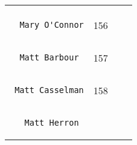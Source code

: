\documentclass[]{article}
\begin{document}
\begin{longtable}[c]{@{}llll@{}}
\begin{minipage}[t]{0.15\columnwidth}
\end{minipage}
\\\noalign{\medskip}
\begin{minipage}[t]{0.39\columnwidth}\raggedright
\begin{verbatim}
  Mary O'Connor
\end{verbatim}
\end{minipage} & \begin{minipage}[t]{0.10\columnwidth}\raggedright
156
\end{minipage} & \begin{minipage}[t]{0.13\columnwidth}\raggedright
\end{minipage} & \begin{minipage}[t]{0.15\columnwidth}\raggedright
\end{minipage}
\\\noalign{\medskip}
\begin{minipage}[t]{0.39\columnwidth}\raggedright
\begin{verbatim}
  Matt Barbour
\end{verbatim}
\end{minipage} & \begin{minipage}[t]{0.10\columnwidth}\raggedright
157
\end{minipage} & \begin{minipage}[t]{0.13\columnwidth}\raggedright
\end{minipage} & \begin{minipage}[t]{0.15\columnwidth}\raggedright
\end{minipage}
\\\noalign{\medskip}
\begin{minipage}[t]{0.39\columnwidth}\raggedright
\begin{verbatim}
 Matt Casselman
\end{verbatim}
\end{minipage} & \begin{minipage}[t]{0.10\columnwidth}\raggedright
158
\end{minipage} & \begin{minipage}[t]{0.13\columnwidth}\raggedright
\end{minipage} & \begin{minipage}[t]{0.15\columnwidth}\raggedright
\end{minipage}
\\\noalign{\medskip}
\begin{minipage}[t]{0.39\columnwidth}\raggedright
\begin{verbatim}
   Matt Herron

\end{verbatim}
\end{minipage}
\end{longtable}
\end{document}
